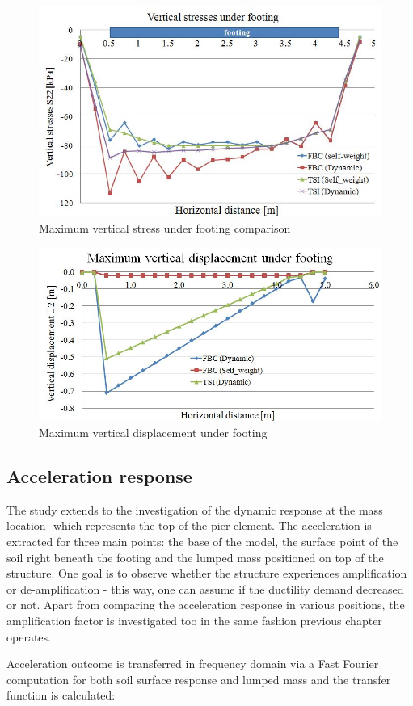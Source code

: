 \begin{figure}[!h]
	\centering
	\includegraphics[width=0.7\linewidth]{"vert stresses"}
	\caption{Maximum vertical stress under footing comparison}
	\label{vert}
\end{figure}

\begin{figure}[!h]
	\centering
	\includegraphics[width=0.7\linewidth]{"displacement"}
	\caption{Maximum vertical displacement under footing}
	\label{inputacc}
\end{figure}

\newpage
\subsection{Acceleration response}
The study extends to the investigation of the dynamic response at the mass location -which represents the top of the pier element. The acceleration is extracted for three main points: the base of the model, the surface point of the soil right beneath the footing and the lumped mass positioned on top of the structure. One goal is to observe whether the structure experiences amplification or de-amplification - this way, one can assume if the ductility demand decreased or not. Apart from comparing the acceleration response in various positions, the amplification factor is investigated too in the same fashion previous chapter operates.

Acceleration outcome is transferred in frequency domain via a Fast Fourier computation for both soil surface response and lumped mass and the transfer function is calculated:

